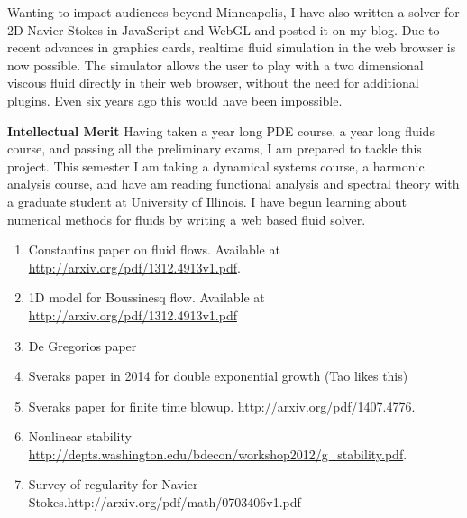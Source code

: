 \documentclass[12pt]{article}
\begin{document}
Wanting to impact audiences beyond Minneapolis, I have also written a solver for 2D Navier-Stokes in JavaScript and WebGL and posted it on my blog. Due to recent advances in graphics cards, realtime fluid simulation in the web browser is now possible. The simulator allows the user to play with a two dimensional viscous fluid directly in their web browser, without the need for additional plugins. Even six years ago this would have been impossible. 

\textbf{Intellectual Merit}
Having taken a year long PDE course, a year long fluids course, and passing all the preliminary exams, I am prepared to tackle this project. This semester I am taking a dynamical systems course, a harmonic analysis course, and have am reading functional analysis and spectral theory with a graduate student at University of Illinois. I have begun learning about numerical methods for fluids by writing a web based fluid solver. 

\begin{enumerate}
	\item Constantins paper on fluid flows. Available at \url{http://arxiv.org/pdf/1312.4913v1.pdf}.
	\item 1D model for Boussinesq flow. Available at \url{http://arxiv.org/pdf/1312.4913v1.pdf} 
	\item De Gregorios paper
	\item Sveraks paper in 2014 for double exponential growth (Tao likes this)
	\item Sveraks paper for finite time blowup. http://arxiv.org/pdf/1407.4776. 
	\item Nonlinear stability \url{http://depts.washington.edu/bdecon/workshop2012/g_stability.pdf}.
	\item Survey of regularity for Navier Stokes.http://arxiv.org/pdf/math/0703406v1.pdf 
\end{enumerate}
\end{document}
